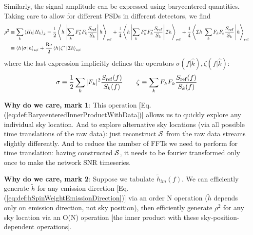\documentclass[twocolumn,prd,nofootinbib]{revtex4}
\newcommand\qmstateproduct[2]{\left\langle#1|#2\right\rangle}
\newcommand\qmoperatorelement[3]{\left\langle#1\left|#2\right|#3\right\rangle}
\begin{document}
\begin{widetext}
\begin{shaded}
Similarly, the signal amplitude can be expressed using barycentered quantities.  Taking care to allow for different PSDs
in different detectors, we find
\begin{align}
\label{eq:CalculateRhoFromBarycenterStrain}
\rho^2& \equiv \sum_k \qmstateproduct{H_k}{H_k}_k 
 =  \frac{1}{2}\qmoperatorelement{h}{\sum_k F_k^* F_k\frac{S_{\rm ref}}{S_k}}{h}_{\rm ref} 
 + \frac{1}{4}\qmoperatorelement{h}{\sum_k F_k^* F_k^* \frac{S_{\rm ref}}{S_k}}{{\cal I} h}_{\rm ref}  
 + \frac{1}{4}\qmoperatorelement{{\cal     I}h}{\sum_k F_k F_k \frac{S_{\rm ref}}{S_k}}{h}_{\rm ref}  \\
&\equiv  \qmoperatorelement{h}{\sigma}{h}_{\rm ref}  + \frac{\text{Re}}{2} \qmoperatorelement{h}{\zeta^*}{{\cal I}
   h}_{\rm ref}
\end{align}
where the last expression implicitly defines the operators $\sigma(f|\hat{k}), \zeta(f|\hat{k})$:
\begin{eqnarray}
\sigma \equiv \frac{1}{2} \sum_k |F_k|^2 \frac{S_{\rm ref}(f)}{S_k(f)} 
\qquad 
\zeta \equiv \sum_k F_k F_k \frac{S_{\rm ref}(f)}{S_k(f)} 
\end{eqnarray}

\noindent \textbf{Why do we care, mark 1}: This operation [Eq. (\ref{eq:def:BarycenteredInnerProductWithData})] allows us to quickly explore any individual sky location.  And to
explore alternative sky locations (via all possible time translations of the raw data): just reconstruct ${\cal S}$ from
the raw data streams slightly differently.   And to reduce the number of FFTs we need to perform for time translation:
having constructed ${\cal S}$, it needs to be fourier transformed only once to make the network SNR timeseries.

\noindent \textbf{Why do we care, mark 2}: Suppose we tabulate $\tilde{h}_{lm}(f)$. We can efficiently generate
$\tilde{h}$ for any emission direction [Eq. (\ref{eq:def:hSpinWeightEmissionDirection})] via an order N operation
($\tilde{h}$ depends only on emission direction, not sky position),
then efficiently generate $\rho^2$ for any sky location via an O(N) operation [the inner product with these
  sky-position-dependent operations].  


\end{shaded}
\end{widetext}
\end{document}
